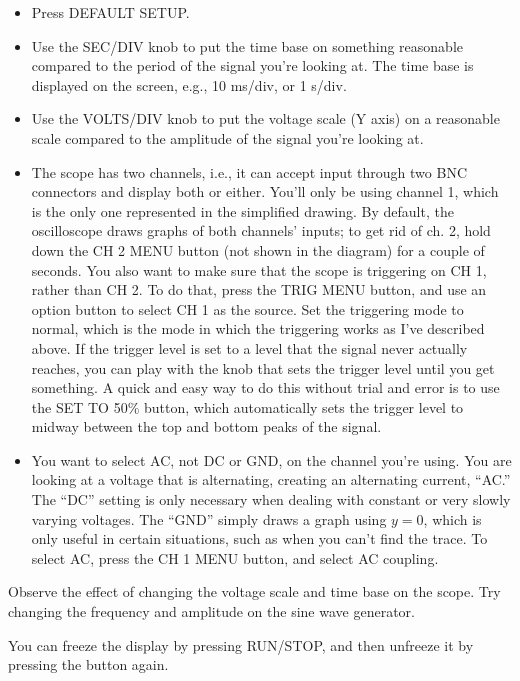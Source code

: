 \begin{itemize}
\item[] Press DEFAULT SETUP.

\item[] Use the SEC/DIV knob to
put the time base on something reasonable compared to the
period of the signal you're looking at. The time base is
displayed on the screen, e.g., 10 ms/div, or 1 s/div.

\item[] Use the VOLTS/DIV knob to
put the voltage scale (Y axis) on a reasonable scale
compared to the amplitude of the signal you're looking at.

\item[] The scope has two channels, i.e., it can accept input
through two BNC connectors and display both or either. You'll
only be using channel 1, which is the only one represented in
the simplified drawing. By default, the oscilloscope draws
graphs of both channels' inputs; to get rid of ch. 2, hold
down the CH 2 MENU button (not shown in the diagram) for a couple
of seconds. You also want to make sure that the scope is triggering
on CH 1, rather than CH 2. To do that, press the TRIG MENU
button, and use an option button to select CH 1 as the source.
Set the triggering mode to normal, which is the mode in which
the triggering works as I've described above.
If the trigger level is set to a level that the signal never
actually reaches, you can play with the knob that sets the trigger
level until you get something. A quick and easy way to do this
without trial and error is to use the SET TO 50\%
button, which
automatically sets the trigger level to midway between the top
and bottom peaks of the signal.

\item[] You want to select AC, not DC or GND, on the channel you're using. You
are looking at a voltage that is alternating, creating an
alternating current, ``AC.'' The ``DC'' setting is only
necessary when dealing with constant or very slowly varying
voltages. The ``GND'' simply draws a graph using $y=0$,
which is only useful in certain situations, such as when you
can't find the trace. To select AC, press the CH 1 MENU
button, and select AC coupling.

\end{itemize}

Observe the effect of changing the voltage scale and time
base on the scope. Try changing the frequency and amplitude
on the sine wave generator.

You can freeze the display by pressing RUN/STOP, and then
unfreeze it by pressing the button again.

